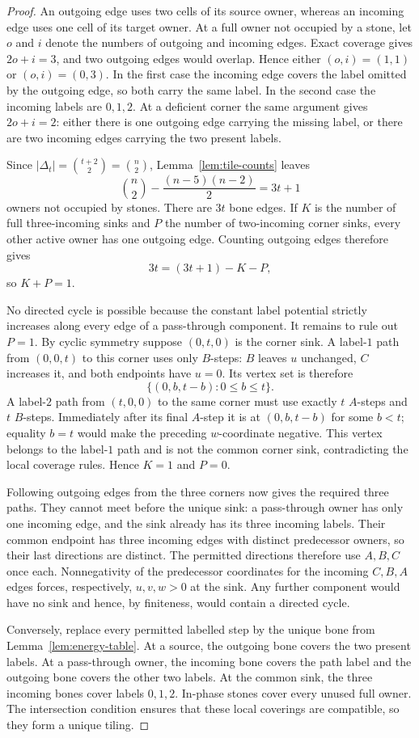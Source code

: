\documentclass[11pt]{amsart}
\theoremstyle{definition}
\begin{document}
\begin{proof}
An outgoing edge uses two cells of its source owner, whereas an incoming edge
uses one cell of its target owner.  At a full owner not occupied by a stone,
let $o$ and $i$ denote the numbers of outgoing and incoming edges.  Exact
coverage gives $2o+i=3$, and two outgoing edges would overlap.  Hence either
$(o,i)=(1,1)$ or $(o,i)=(0,3)$.  In the first case the incoming edge covers
the label omitted by the outgoing edge, so both carry the same label.  In the
second case the incoming labels are $0,1,2$.  At a deficient corner the same
argument gives $2o+i=2$: either there is one outgoing edge carrying the
missing label, or there are two incoming edges carrying the two present
labels.

Since $|\Delta_t|=\binom{t+2}{2}=\binom n2$, Lemma~\ref{lem:tile-counts}
leaves
\[
 \binom n2-\frac{(n-5)(n-2)}2=3t+1
\]
owners not occupied by stones.  There are $3t$ bone edges.  If $K$ is the
number of full three-incoming sinks and $P$ the number of two-incoming corner
sinks, every other active owner has one outgoing edge.  Counting outgoing
edges therefore gives
\[
 3t=(3t+1)-K-P,
\]
so $K+P=1$.

No directed cycle is possible because the constant label potential strictly
increases along every edge of a pass-through component.  It remains to rule
out $P=1$.  By cyclic symmetry suppose $(0,t,0)$ is the corner sink.  A
label-$1$ path from $(0,0,t)$ to this corner uses only $B$-steps: $B$ leaves
$u$ unchanged, $C$ increases it, and both endpoints have $u=0$.  Its vertex
set is therefore
\[
 \{(0,b,t-b):0\leq b\leq t\}.
\]
A label-$2$ path from $(t,0,0)$ to the same corner must use exactly $t$
$A$-steps and $t$ $B$-steps.  Immediately after its final $A$-step it is at
$(0,b,t-b)$ for some $b<t$; equality $b=t$ would make the preceding
$w$-coordinate negative.  This vertex belongs to the label-$1$ path and is
not the common corner sink, contradicting the local coverage rules.  Hence
$K=1$ and $P=0$.

Following outgoing edges from the three corners now gives the required three
paths.  They cannot meet before the unique sink: a pass-through owner has only
one incoming edge, and the sink already has its three incoming labels.  Their
common endpoint has three incoming edges with distinct predecessor owners,
so their last directions are distinct.  The permitted directions therefore
use $A,B,C$ once each.  Nonnegativity of the predecessor coordinates for
the incoming $C,B,A$ edges forces, respectively, $u,v,w>0$ at the sink.
Any further component would have no sink and hence, by
finiteness, would contain a directed cycle.

Conversely, replace every permitted labelled step by the unique bone from
Lemma~\ref{lem:energy-table}.  At a source, the outgoing bone covers the two
present labels.  At a pass-through owner, the incoming bone covers the path
label and the outgoing bone covers the other two labels.  At the common sink,
the three incoming bones cover labels $0,1,2$.  In-phase stones cover every
unused full owner.  The intersection condition ensures that these local
coverings are compatible, so they form a unique tiling.
\end{proof}
\end{document}
